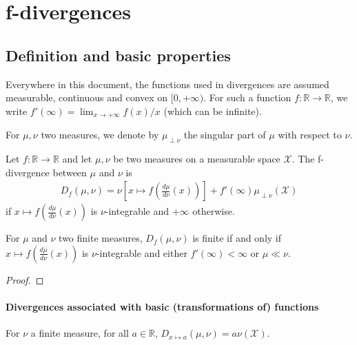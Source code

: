 \section{f-divergences}

\subsection{Definition and basic properties}

Everywhere in this document, the functions used in divergences are assumed measurable, continuous and convex on $[0, +\infty)$.
For such a function $f : \mathbb{R} \to \mathbb{R}$, we write $f'(\infty) = \lim_{x \to +\infty} f(x)/x$ (which can be infinite).

For $\mu, \nu$ two measures, we denote by $\mu_{\perp \nu}$ the singular part of $\mu$ with respect to $\nu$.

\begin{definition}[f-divergence]
  \label{def:fDiv}
  \leanok
  Let $f : \mathbb{R} \to \mathbb{R}$ and let $\mu, \nu$ be two measures on a measurable space $\mathcal X$. The f-divergence between $\mu$ and $\nu$ is
  \begin{align*}
  D_f(\mu, \nu) = \nu\left[x \mapsto f\left(\frac{d \mu}{d \nu}(x)\right)\right] + f'(\infty) \mu_{\perp \nu}(\mathcal X)
  \end{align*}
  if $x \mapsto f\left(\frac{d \mu}{d \nu}(x)\right)$ is $\nu$-integrable and $+\infty$ otherwise.
\end{definition}

\begin{lemma}
  \label{lem:fDiv_ne_top_iff}
  \leanok
  For $\mu$ and $\nu$ two finite measures, $D_f(\mu, \nu)$ is finite if and only if $x \mapsto f\left(\frac{d \mu}{d \nu}(x)\right)$ is $\nu$-integrable and either $f'(\infty) < \infty$ or $\mu \ll \nu$.
\end{lemma}

\begin{proof}\leanok
\end{proof}



\paragraph{Divergences associated with basic (transformations of) functions}

\begin{lemma}
  \label{lem:fDiv_const}
  \leanok
  For $\nu$ a finite measure, for all $a \in \mathbb{R}$, $D_{x \mapsto a}(\mu, \nu) = a \nu(\mathcal X)$.
\end{lemma}

